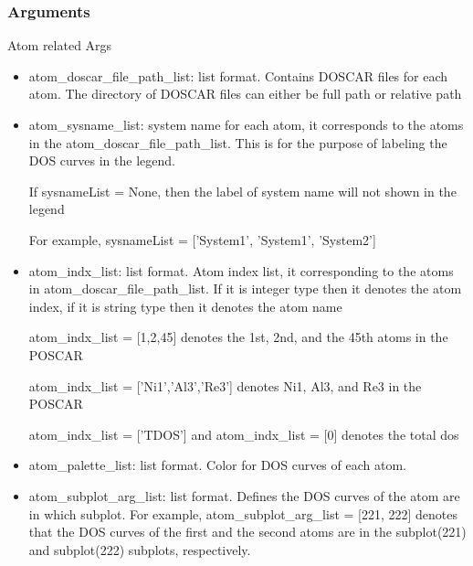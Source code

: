 \documentclass[12pt]{book}
\begin{document}
\subsubsection{Arguments}

Atom related Args
\begin{itemize}
\item atom\_doscar\_file\_path\_list: list format. Contains DOSCAR files for each atom. The directory of DOSCAR files can either be full path or relative path
\item atom\_sysname\_list: system name for each atom, it corresponds to the atoms in the atom\_doscar\_file\_path\_list. This is for the purpose of labeling the DOS curves in the legend.
           
		   If sysnameList = None, then the label of system name will not shown in the legend
           
		   For example, sysnameList = ['System1', 'System1', 'System2']
\item atom\_indx\_list: list format. Atom index list, it corresponding to the atoms in  atom\_doscar\_file\_path\_list. If it is integer type then it denotes the atom index, if it is string type then it denotes the atom name
           
		   atom\_indx\_list = [1,2,45] denotes the 1st, 2nd, and the 45th atoms in the POSCAR
           
		   atom\_indx\_list = ['Ni1','Al3','Re3'] denotes Ni1, Al3, and Re3 in the POSCAR
           
		   atom\_indx\_list = ['TDOS'] and atom\_indx\_list = [0] denotes the total dos
\item atom\_palette\_list: list format. Color for DOS curves of each atom.
\item atom\_subplot\_arg\_list: list format. Defines the DOS curves of the atom are in which subplot. For example, atom\_subplot\_arg\_list = [221, 222] denotes that the DOS curves of the first and the second atoms are in the subplot(221) and subplot(222) subplots, respectively. 
\end{itemize}
\end{document}
